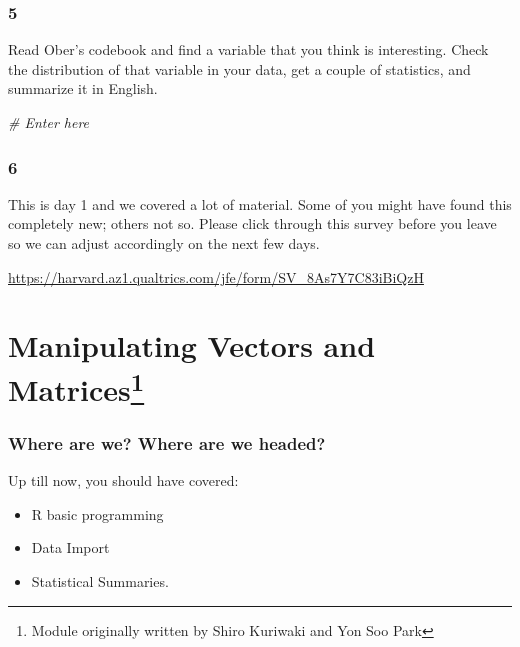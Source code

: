 \documentclass[]{book}
\newenvironment{Shaded}{\begin{snugshade}}{\end{snugshade}}
\newcommand{\CommentTok}[1]{\textcolor[rgb]{0.56,0.35,0.01}{\textit{#1}}}
\providecommand{\tightlist}{%
  \setlength{\itemsep}{0pt}\setlength{\parskip}{0pt}}
\let\rmarkdownfootnote\footnote%
\def\footnote{\protect\rmarkdownfootnote}
\theoremstyle{definition}
\theoremstyle{definition}
\theoremstyle{definition}
\theoremstyle{remark}
\begin{document}
\subsection*{5}\label{section-4}

Read Ober's codebook and find a variable that you think is interesting.
Check the distribution of that variable in your data, get a couple of
statistics, and summarize it in English.

\begin{Shaded}
\begin{Highlighting}[]
\CommentTok{# Enter here}
\end{Highlighting}
\end{Shaded}

\subsection*{6}\label{section-5}

This is day 1 and we covered a lot of material. Some of you might have
found this completely new; others not so. Please click through this
survey before you leave so we can adjust accordingly on the next few
days.

\url{https://harvard.az1.qualtrics.com/jfe/form/SV_8As7Y7C83iBiQzH}

\chapter[Manipulating Vectors and Matrices]{\texorpdfstring{Manipulating
Vectors and Matrices\footnote{Module originally written by Shiro
  Kuriwaki and Yon Soo Park}}{Manipulating Vectors and Matrices}}\label{rmatrices}

\subsection*{Where are we? Where are we
headed?}\label{where-are-we-where-are-we-headed-1}

Up till now, you should have covered:

\begin{itemize}
\tightlist
\item
  R basic programming
\item
  Data Import
\item
  Statistical Summaries.
\end{itemize}
\end{document}
